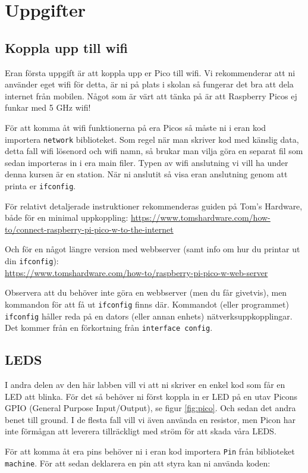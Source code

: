 \documentclass{article}
\begin{document}
\section*{Uppgifter}
\subsection*{Koppla upp till wifi}
Eran första uppgift är att koppla upp er Pico till wifi. Vi rekommenderar att ni använder eget wifi för detta, är ni på plats i skolan så fungerar det bra att dela internet från mobilen. Något som är värt att tänka på är att Raspberry Picos ej funkar med 5 GHz wifi!

För att komma åt wifi funktionerna på era Picos så måste ni i eran kod importera \texttt{network} biblioteket.
Som regel när man skriver kod med känslig data, detta fall wifi lösenord och wifi namn, så brukar man vilja göra en separat fil som sedan importeras in i era main filer. Typen av wifi anslutning vi vill ha under denna kursen är en station. När ni anslutit så visa eran anslutning genom att printa er \texttt{ifconfig}.

För relativt detaljerade instruktioner rekommenderas guiden på Tom's Hardware, både för en minimal uppkoppling:
\url{https://www.tomshardware.com/how-to/connect-raspberry-pi-pico-w-to-the-internet}

Och för en något längre version med webbserver (samt info om hur du printar ut din \texttt{ifconfig}):\\
\url{https://www.tomshardware.com/how-to/raspberry-pi-pico-w-web-server}

Observera att du behöver inte göra en webbserver (men du får givetvis), men kommandon för att få ut \texttt{ifconfig} finns där. Kommandot (eller programmet) \texttt{ifconfig} håller reda på en dators (eller annan enhets) nätverksuppkopplingar. Det kommer från en förkortning från \texttt{interface config}.
\subsection*{LEDS}
I andra delen av den här labben vill vi att ni skriver en enkel kod som får en LED att blinka. För det så behöver ni först koppla in er LED på en utav Picons GPIO (General Purpose Input/Output), se figur \ref{fig:pico}. Och sedan det andra benet till ground. I de flesta fall vill vi även använda en resistor, men Picon har inte förmågan att leverera tillräckligt med ström för att skada våra LEDS.

För att komma åt era pins behöver ni i eran kod importera \texttt{Pin} från biblioteket \texttt{machine}. För att sedan deklarera en pin att styra kan ni använda koden:
\end{document}
